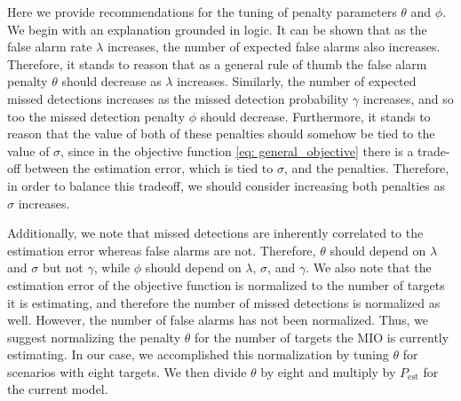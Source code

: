 Here we provide recommendations for the tuning of penalty parameters $\theta$ and $\phi$. We begin with an explanation grounded in logic. It can be shown that as the false alarm rate $\lambda$ increases, the number of expected false alarms also increases. Therefore, it stands to reason that as a general rule of thumb the false alarm penalty $\theta$ should decrease as $\lambda$ increases. Similarly, the number of expected missed detections increases as the missed detection probability $\gamma$ increases, and so too the missed detection penalty $\phi$ should decrease. Furthermore, it stands to reason that the value of both of these penalties should somehow be tied to the value of $\sigma$, since in the objective function \eqref{eq: general_objective} there is a trade-off between the estimation error, which is tied to $\sigma$, and the penalties. Therefore, in order to balance this tradeoff, we should consider increasing both penalties as $\sigma$ increases. 

Additionally, we note that missed detections are inherently correlated to the estimation error whereas false alarms are not. Therefore, $\theta$ should depend on $\lambda$ and $\sigma$ but not $\gamma$, while $\phi$ should depend on $\lambda$, $\sigma$, and $\gamma$. We also note that the estimation error of the objective function is normalized to the number of targets it is estimating, and therefore the number of missed detections is normalized as well. However, the number of false alarms has not been normalized. Thus, we suggest normalizing the penalty $\theta$ for the number of targets the MIO is currently estimating. In our case, we accomplished this normalization by tuning $\theta$ for scenarios with eight targets. We then divide $\theta$ by eight and multiply by $P_{\text{est}}$ for the current model. 

